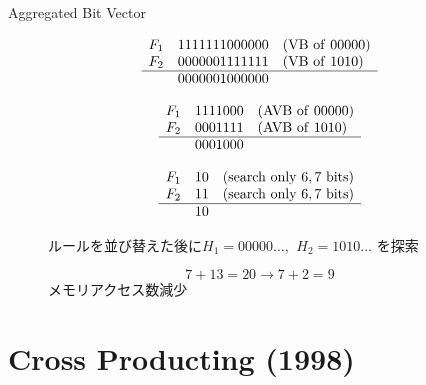 \documentclass[a4paper,10pt]{jarticle}
\begin{document}
\begin{frame}{Aggregated Bit Vector}
\begin{figure}[h]
 \def\@captype{table}
 \begin{minipage}[c]{.5\textwidth}
   \begin{equation*}
    \begin{array}{lll}
     F_{1} & 1111111000000 & ({\rm VB \ of \ } 00000) \\
     F_{2} & 0000001111111 & ({\rm VB \ of \ } 1010) \\ \hline
           & 0000001000000 &
    \end{array}
   \end{equation*}

   \begin{equation*}
    \begin{array}{lll}
     F_{1} & 1111000 & ({\rm AVB \ of \ } 00000) \\
     F_{2} & 0001111 & ({\rm AVB \ of \ } 1010) \\ \hline
           & 0001000 & 
    \end{array}
   \end{equation*}

   \begin{equation*}
    \begin{array}{lll}
     F_{1} & 10 & ({\rm search \ only } \ 6,7 \ {\rm bits}) \\
     F_{2} & 11 & ({\rm search \ only } \ 6,7 \ {\rm bits}) \\ \hline
           & 10 & 
    \end{array}
   \end{equation*}

  \end{minipage}
  \hfill
  \begin{minipage}[c]{.43\textwidth}
  
  \vspace{3mm}
  ルールを並び替えた後に$H_{1} = 00000 \dots$, $\ H_{2} = 1010 \dots $ を探索

  \[
   7 + 13 = 20 \to 7 + 2 = 9
  \]
  メモリアクセス数減少
  \end{minipage}
\end{figure}

\end{frame}


\section{Cross Producting (1998)}
\end{document}

